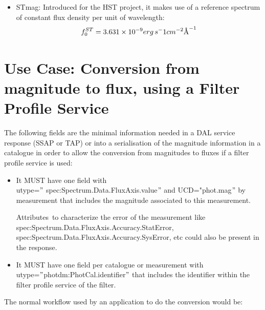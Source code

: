 \documentclass[11pt,a4paper]{ivoa}
\newcommand{\angstrom}{\mbox{\normalfont\AA}}
\begin{document}
\begin{itemize}
	\item{STmag: Introduced for the HST project, it makes use of a reference spectrum of 
	constant flux density per unit of wavelength:
\begin{equation} \label{eq:32}
f_0^{ST} = 3.631 \times 10^{-9} erg\, s^-1 cm^{-2} \angstrom ^{-1}
\end{equation}}

\end{itemize}
\section{Use Case: Conversion from magnitude to flux, using a Filter Profile Service}
The following fields are the minimal information needed in a DAL service response (SSAP 
or TAP) or into a serialisation of the magnitude information in a catalogue in order to 
allow the conversion from magnitudes to fluxes if a filter profile service is used:
\par

\begin{itemize}
	\item{It MUST have one field with\\ utype=$"$ spec:Spectrum.Data.FluxAxis.value$"$  
	and UCD="phot.mag$"$  by measurement that includes the magnitude associated to 
	this measurement. \par}

Attributes\ to characterize the error of the measurement like\\  
spec:Spectrum.Data.FluxAxis.Accuracy.StatError,\\ 
spec:Spectrum.Data.FluxAxis.Accuracy.SysError, etc could also be present 
in the response.
\par

	\item{It MUST have one field per catalogue or measurement 
	with\\ utype=$"$photdm:PhotCal.identifier$"$  that includes the identifier within the 
	filter profile service of the filter.}
\end{itemize}\par

The normal workflow used by an application to do the conversion would be:
\par
\end{document}
